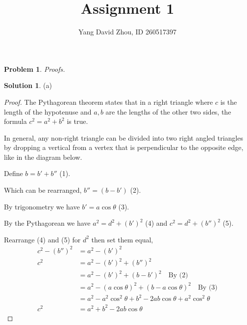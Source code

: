 \documentclass{article}
\newtheorem{problem}{Problem}
\theoremstyle{definition}
\newtheorem*{solution}{Solution}
\begin{document}
 \title{Assignment 1} 

\author{Yang David Zhou, ID 260517397} 
\date{}
\maketitle

\begin{problem} Proofs.

\end{problem}

\begin{solution}

(a) \begin{proof}
The Pythagorean theorem states that in a right triangle where $c$ is the length of the hypotenuse and $a,b$ are the lengths of the other two sides, the formula $c^2=a^2+b^2$ is true.

In general, any non-right triangle can be divided into two right angled triangles by dropping a vertical from a vertex that is perpendicular to the opposite edge, like in the diagram below.

\begin{center}
\end{center}

Define $b=b'+b''$ (1).

Which can be rearranged, $b''=(b-b')$ (2).

By trigonometry we have $b'=a\cos \theta$ (3).

By the Pythagorean we have $a^2=d^2+(b')^2$ (4) and $c^2=d^2+(b'')^2$ (5).

Rearrange (4) and (5) for $d^2$ then set them equal,
\begin{align*}
c^2-(b'')^2&=a^2-(b')^2 \\
c^2&=a^2-(b')^2+(b'')^2 \\
&=a^2-(b')^2+(b-b')^2 \quad \text{By (2)} \\
&=a^2-(a\cos \theta )^2+(b-a\cos \theta)^2 \quad \text{By (3)} \\
&=a^2-a^2\cos ^2\theta+b^2-2ab\cos\theta+a^2\cos^2\theta \\
c^2&=a^2+b^2-2ab\cos\theta
\end{align*}


\end{proof}
\end{solution}
\end{document}
